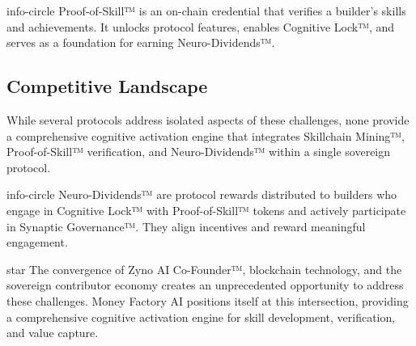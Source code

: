 \begin{mfai-box}{info-circle}
Proof-of-Skill™ is an on-chain credential that verifies a builder's skills and achievements. It unlocks protocol features, enables Cognitive Lock™, and serves as a foundation for earning Neuro-Dividends™.
\end{mfai-box}

\subsection{Competitive Landscape}

While several protocols address isolated aspects of these challenges, none provide a comprehensive cognitive activation engine that integrates Skillchain Mining™, Proof-of-Skill™ verification, and Neuro-Dividends™ within a single sovereign protocol.

\begin{center}
\end{center}

\begin{mfai-box}{info-circle}
Neuro-Dividends™ are protocol rewards distributed to builders who engage in Cognitive Lock™ with Proof-of-Skill™ tokens and actively participate in Synaptic Governance™. They align incentives and reward meaningful engagement.
\end{mfai-box}

\begin{mfai-box}{star}
The convergence of Zyno AI Co-Founder™, blockchain technology, and the sovereign contributor economy creates an unprecedented opportunity to address these challenges. Money Factory AI positions itself at this intersection, providing a comprehensive cognitive activation engine for skill development, verification, and value capture.
\end{mfai-box}

